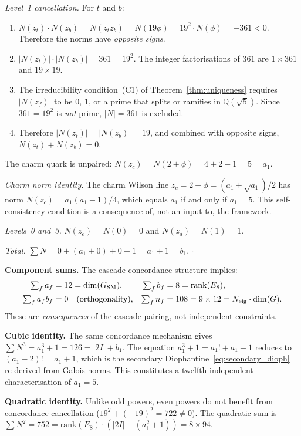 \documentclass[12pt,a4paper]{article}
\theoremstyle{definition}
\begin{document}
\emph{Level~1 cancellation.}  For $t$ and $b$:
\begin{enumerate}
\item $N(z_t) \cdot N(z_b) = N(z_t z_b) = N(19\phi) = 19^2 \cdot N(\phi) = -361 < 0$.  Therefore the norms have \emph{opposite signs}.
\item $|N(z_t)| \cdot |N(z_b)| = 361 = 19^2$.  The integer factorisations of $361$ are $1 \times 361$ and $19 \times 19$.
\item The irreducibility condition~(C1) of Theorem~\ref{thm:uniqueness} requires $|N(z_f)|$ to be $0$, $1$, or a prime that splits or ramifies in $\mathbb{Q}(\sqrt{5})$.  Since $361 = 19^2$ is \emph{not} prime, $|N| = 361$ is excluded.
\item Therefore $|N(z_t)| = |N(z_b)| = 19$, and combined with opposite signs, $N(z_t) + N(z_b) = 0$.
\end{enumerate}
The charm quark is unpaired: $N(z_c) = N(2+\phi) = 4 + 2 - 1 = 5 = a_1$.

\emph{Charm norm identity.}  The charm Wilson line $z_c = 2 + \phi = (a_1 + \sqrt{a_1})/2$ has norm $N(z_c) = a_1(a_1-1)/4$, which equals $a_1$ if and only if $a_1 = 5$.  This self-consistency condition is a consequence of, not an input to, the framework.

\emph{Levels~0 and~3.}  $N(z_e) = N(0) = 0$ and $N(z_d) = N(1) = 1$.

\emph{Total.}  $\sum N = 0 + (a_1 + 0) + 0 + 1 = a_1 + 1 = b_1$.  \hfill$\square$

\textbf{Component sums.}  The cascade concordance structure implies:
\begin{align}
\textstyle\sum_f a_f &= 12 = \dim(G_{\text{SM}}), &
\textstyle\sum_f b_f &= 8 = \mathrm{rank}(E_8), \\
\textstyle\sum_f a_f b_f &= 0 \quad \text{(orthogonality)}, &
\textstyle\sum_f n_f &= 108 = 9 \times 12 = N_{\text{eig}} \cdot \dim(G). \notag
\end{align}
These are \emph{consequences} of the cascade pairing, not independent constraints.

\textbf{Cubic identity.}  The same concordance mechanism gives $\sum N^3 = a_1^3 + 1 = 126 = |2I| + b_1$.  The equation $a_1^3 + 1 = a_1! + a_1 + 1$ reduces to $(a_1 - 2)! = a_1 + 1$, which is the secondary Diophantine~\eqref{eq:secondary_dioph} re-derived from Galois norms.  This constitutes a twelfth independent characterisation of $a_1 = 5$.

\textbf{Quadratic identity.}  Unlike odd powers, even powers do not benefit from concordance cancellation ($19^2 + (-19)^2 = 722 \neq 0$).  The quadratic sum is $\sum N^2 = 752 = \mathrm{rank}(E_8) \cdot (|2I| - (a_1^2+1)) = 8 \times 94$.
\end{document}
